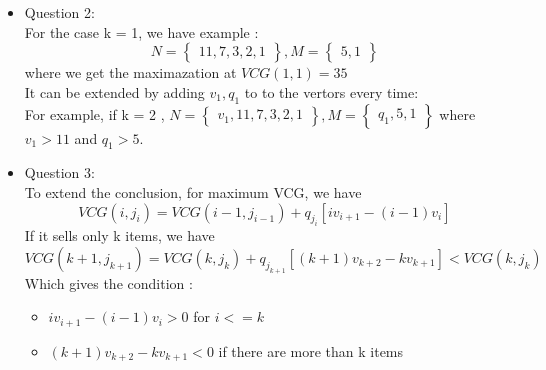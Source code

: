 \documentclass{article}
\newenvironment{answer}{\par\color{ForestGreen}}{\par}
\begin{document}
\begin{answer}
\begin{itemize}
\item Question 2: \\
For the case k = 1, we have example :
$$ N = \begin{Bmatrix}
  11, 7, 3, 2, 1
\end{Bmatrix}, M = \begin{Bmatrix}
  5, 1
\end{Bmatrix}  $$
where we get the maximazation at $VCG(1,1) = 35$ \\

It can be extended by adding $v_1, q_1$ to to the vertors every time:\\
For example, if k = 2 ,  $N = \begin{Bmatrix}
  v_1, 11, 7, 3, 2, 1
\end{Bmatrix}, M = \begin{Bmatrix}
  q_1, 5, 1
\end{Bmatrix}$ where $v_1 > 11$ and $q_1 > 5$.

\item Question 3: \\
To extend the conclusion, for maximum VCG, we have $$VCG(i, j_i) = VCG(i-1, j_{i-1}) + q_{j_i}[iv_{i+1} - (i-1)v_i]$$
If it sells only k items, we have $$VCG(k+1, j_{k+1}) = VCG(k, j_k) + q_{j_{k+1}}[(k+1)v_{k+2} - kv_{k+1}] < VCG(k, j_k)$$
Which gives the condition : \begin{itemize}
  \item $iv_{i+1} - (i-1)v_i > 0 $ for $i <= k$
  \item $(k+1)v_{k+2} - kv_{k+1} < 0 $ if there are more than k items
\end{itemize}

\end{itemize}
\end{answer}
\end{document}
